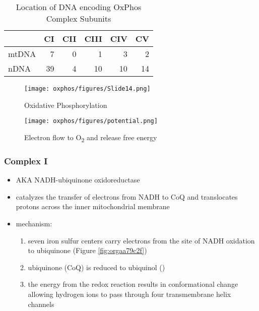 \documentclass{scrartcl}
\begin{document}
\begin{table}[htbp]
\caption{\label{tab:org191bace}Location of DNA encoding OxPhos Complex Subunits}
\centering
\begin{tabular}{lrrrrr}
 & CI & CII & CIII & CIV & CV\\
\hline
mtDNA & 7 & 0 & 1 & 3 & 2\\
nDNA & 39 & 4 & 10 & 10 & 14\\
\end{tabular}
\end{table}

\begin{figure}[htbp]
\centering
\texttt{[image: oxphos/figures/Slide14.png]}
\caption[ETC]{\label{fig:org50e8c32}Oxidative Phosphorylation}
\end{figure}

\begin{figure}[htbp]
\centering
\texttt{[image: oxphos/figures/potential.png]}
\caption[redox]{\label{fig:org1cdc640}Electron flow to O\textsubscript{2} and release free energy}
\end{figure}

\subsubsection{Complex I}
\label{sec:orga611d29}
\begin{itemize}
\item AKA NADH-ubiquinone oxidoreductase
\item catalyzes the transfer of electrons from NADH to CoQ and
translocates protons across the inner mitochondrial membrane
\end{itemize}

{\small{}}

\begin{itemize}
\item mechanism: 
\begin{enumerate}
\item seven iron sulfur centers carry electrons from the site of NADH
oxidation to ubiquinone (Figure \ref{fig:orgaa79c2f})
\item ubiquinone (CoQ) is reduced to ubiquinol ()
\item the energy from the redox reaction results in conformational
change allowing hydrogen ions to pass through four transmembrane
helix channels
\end{enumerate}
\end{itemize}
\end{document}
